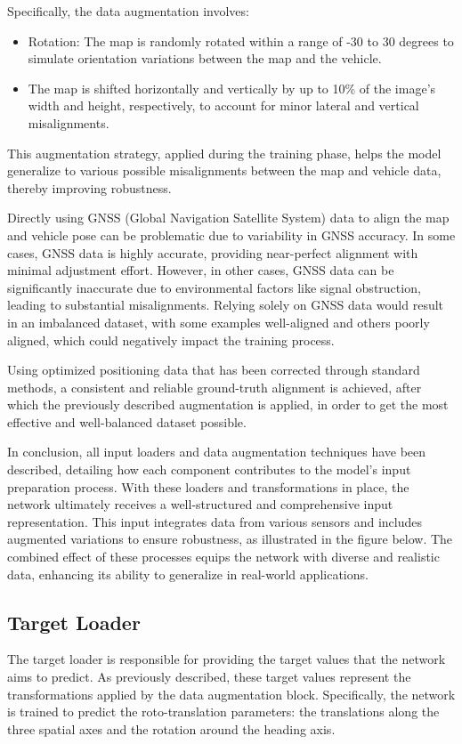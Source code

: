 Specifically, the data augmentation involves:
\begin{itemize}
    \item Rotation: The map is randomly rotated within a range of -30 to 30 degrees to simulate orientation variations between the map and the vehicle.
    \item The map is shifted horizontally and vertically by up to 10\% of the image’s width and height, respectively, to account for minor lateral and vertical misalignments.
\end{itemize}

This augmentation strategy, applied during the training phase, helps the model generalize to various possible misalignments between the map and vehicle data, thereby improving robustness.

Directly using GNSS (Global Navigation Satellite System) data to align the map and vehicle pose can be problematic due to variability in GNSS accuracy. In some cases, GNSS data is highly accurate, providing near-perfect alignment with minimal adjustment effort. However, in other cases, GNSS data can be significantly inaccurate due to environmental factors like signal obstruction, leading to substantial misalignments. Relying solely on GNSS data would result in an imbalanced dataset, with some examples well-aligned and others poorly aligned, which could negatively impact the training process.

Using optimized positioning data that has been corrected through standard methods, a consistent and reliable ground-truth alignment is achieved, after which the previously described augmentation is applied, in order to get the most effective and well-balanced dataset possible.

In conclusion, all input loaders and data augmentation techniques have been described, detailing how each component contributes to the model's input preparation process. With these loaders and transformations in place, the network ultimately receives a well-structured and comprehensive input representation. This input integrates data from various sensors and includes augmented variations to ensure robustness, as illustrated in the figure below. The combined effect of these processes equips the network with diverse and realistic data, enhancing its ability to generalize in real-world applications.

\subsection{Target Loader}
The target loader is responsible for providing the target values that the network aims to predict. As previously described, these target values represent the transformations applied by the data augmentation block. Specifically, the network is trained to predict the roto-translation parameters: the translations along the three spatial axes and the rotation around the heading axis.

